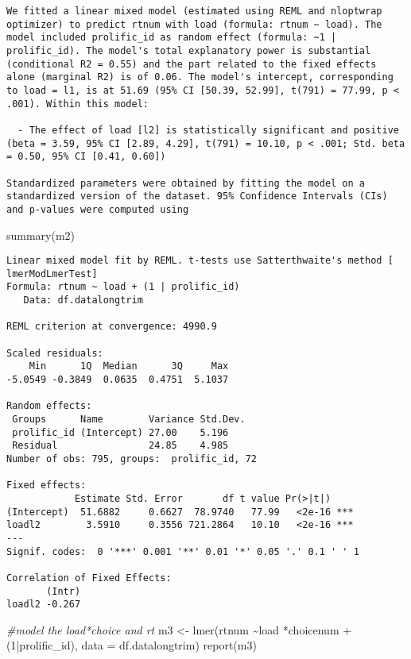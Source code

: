 \documentclass[
]{article}
\newenvironment{Shaded}{\begin{snugshade}}{\end{snugshade}}
\newcommand{\AttributeTok}[1]{\textcolor[rgb]{0.77,0.63,0.00}{#1}}
\newcommand{\CommentTok}[1]{\textcolor[rgb]{0.56,0.35,0.01}{\textit{#1}}}
\newcommand{\DecValTok}[1]{\textcolor[rgb]{0.00,0.00,0.81}{#1}}
\newcommand{\FunctionTok}[1]{\textcolor[rgb]{0.00,0.00,0.00}{#1}}
\newcommand{\NormalTok}[1]{#1}
\newcommand{\OtherTok}[1]{\textcolor[rgb]{0.56,0.35,0.01}{#1}}
\newcommand{\SpecialCharTok}[1]{\textcolor[rgb]{0.00,0.00,0.00}{#1}}
\begin{document}
\begin{verbatim}
We fitted a linear mixed model (estimated using REML and nloptwrap optimizer) to predict rtnum with load (formula: rtnum ~ load). The model included prolific_id as random effect (formula: ~1 | prolific_id). The model's total explanatory power is substantial (conditional R2 = 0.55) and the part related to the fixed effects alone (marginal R2) is of 0.06. The model's intercept, corresponding to load = l1, is at 51.69 (95% CI [50.39, 52.99], t(791) = 77.99, p < .001). Within this model:

  - The effect of load [l2] is statistically significant and positive (beta = 3.59, 95% CI [2.89, 4.29], t(791) = 10.10, p < .001; Std. beta = 0.50, 95% CI [0.41, 0.60])

Standardized parameters were obtained by fitting the model on a standardized version of the dataset. 95% Confidence Intervals (CIs) and p-values were computed using 
\end{verbatim}

\begin{Shaded}
\begin{Highlighting}[]
\FunctionTok{summary}\NormalTok{(m2)}
\end{Highlighting}
\end{Shaded}

\begin{verbatim}
Linear mixed model fit by REML. t-tests use Satterthwaite's method [
lmerModLmerTest]
Formula: rtnum ~ load + (1 | prolific_id)
   Data: df.datalongtrim

REML criterion at convergence: 4990.9

Scaled residuals: 
    Min      1Q  Median      3Q     Max 
-5.0549 -0.3849  0.0635  0.4751  5.1037 

Random effects:
 Groups      Name        Variance Std.Dev.
 prolific_id (Intercept) 27.00    5.196   
 Residual                24.85    4.985   
Number of obs: 795, groups:  prolific_id, 72

Fixed effects:
            Estimate Std. Error       df t value Pr(>|t|)    
(Intercept)  51.6882     0.6627  78.9740   77.99   <2e-16 ***
loadl2        3.5910     0.3556 721.2864   10.10   <2e-16 ***
---
Signif. codes:  0 '***' 0.001 '**' 0.01 '*' 0.05 '.' 0.1 ' ' 1

Correlation of Fixed Effects:
       (Intr)
loadl2 -0.267
\end{verbatim}

\begin{Shaded}
\begin{Highlighting}[]
\CommentTok{\#model the load*choice and rt}
\NormalTok{m3 }\OtherTok{\textless{}{-}} \FunctionTok{lmer}\NormalTok{(rtnum }\SpecialCharTok{\textasciitilde{}}\NormalTok{load }\SpecialCharTok{*}\NormalTok{choicenum }\SpecialCharTok{+}\NormalTok{(}\DecValTok{1}\SpecialCharTok{|}\NormalTok{prolific\_id),}
           \AttributeTok{data =}\NormalTok{ df.datalongtrim)}
\FunctionTok{report}\NormalTok{(m3)}
\end{Highlighting}
\end{Shaded}
\end{document}
